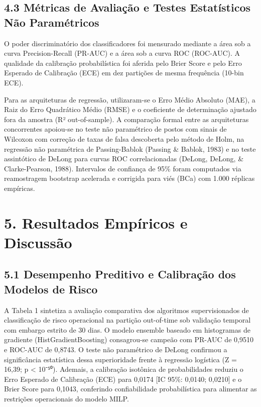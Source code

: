 \documentclass[10pt,a4paper,journal]{article}
\begin{document}
\subsection{4.3 Métricas de Avaliação e Testes Estatísticos Não Paramétricos}
O poder discriminatório dos classificadores foi mensurado mediante a área sob a curva Precision-Recall (PR-AUC) e a área sob a curva ROC (ROC-AUC). A qualidade da calibração probabilística foi aferida pelo Brier Score e pelo Erro Esperado de Calibração (ECE) em dez partições de mesma frequência (10-bin ECE).

Para as arquiteturas de regressão, utilizaram-se o Erro Médio Absoluto (MAE), a Raiz do Erro Quadrático Médio (RMSE) e o coeficiente de determinação ajustado fora da amostra (R² out-of-sample). A comparação formal entre as arquiteturas concorrentes apoiou-se no teste não paramétrico de postos com sinais de Wilcoxon com correção de taxas de falsa descoberta pelo método de Holm, na regressão não paramétrica de Passing-Bablok (Passing \& Bablok, 1983) e no teste assintótico de DeLong para curvas ROC correlacionadas (DeLong, DeLong, \& Clarke-Pearson, 1988). Intervalos de confiança de 95\% foram computados via reamostragem bootstrap acelerada e corrigida para viés (BCa) com 1.000 réplicas empíricas.

\section{5. Resultados Empíricos e Discussão}
\subsection{5.1 Desempenho Preditivo e Calibração dos Modelos de Risco}
A Tabela 1 sintetiza a avaliação comparativa dos algoritmos supervisionados de classificação de risco operacional na partição out-of-time sob validação temporal com embargo estrito de 30 dias. O modelo ensemble baseado em histogramas de gradiente (HistGradientBoosting) consagrou-se campeão com PR-AUC de 0,9510 e ROC-AUC de 0,8743. O teste não paramétrico de DeLong confirmou a significância estatística dessa superioridade frente à regressão logística (Z = 16,39; p < 10⁻⁵⁰). Ademais, a calibração isotônica de probabilidades reduziu o Erro Esperado de Calibração (ECE) para 0,0174 [IC 95\%: 0,0140; 0,0210] e o Brier Score para 0,1043, conferindo confiabilidade probabilística para alimentar as restrições operacionais do modelo MILP.
\end{document}
